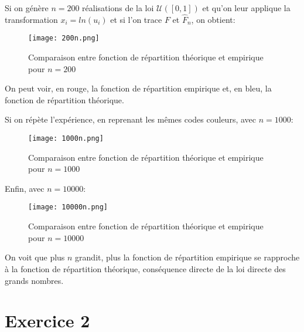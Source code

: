 \documentclass{article}
\begin{document}
\begin{multicols}{2}
Si on génère $n = 200$ réalisations de la loi $\mathcal{U}([0, 1])$ et qu'on
leur applique la transformation $x_i = ln(u_i)$ et si l'on trace $F$ et
$\hat{F}_n$, on obtient:

\begin{figure}[H]
    \begin{center}
        \texttt{[image: 200n.png]}
        \centering
        \captionsetup{justification=centering}
        \caption{\label{fig:200n}Comparaison entre fonction de répartition théorique et empirique pour $n = 200$}
    \end{center}
\end{figure}

On peut voir, en rouge, la fonction de répartition empirique et, en bleu, la
fonction de répartition théorique.

Si on répète l'expérience, en reprenant les mêmes codes couleurs, avec
$n = 1000$:

\begin{figure}[H]
    \begin{center}
        \texttt{[image: 1000n.png]}
        \centering
        \captionsetup{justification=centering}
        \caption{\label{fig:1000n}Comparaison entre fonction de répartition théorique et empirique pour $n = 1000$}
    \end{center}
\end{figure}

Enfin, avec $n = 10000$:

\begin{figure}[H]
    \begin{center}
        \texttt{[image: 10000n.png]}
        \centering
        \captionsetup{justification=centering}
        \caption{\label{fig:10000n}Comparaison entre fonction de répartition théorique et empirique pour $n = 10000$}
    \end{center}
\end{figure}

On voit que plus $n$ grandit, plus la fonction de répartition empirique se
rapproche à la fonction de répartition théorique, conséquence directe de la
loi directe des grands nombres.


\section{Exercice 2}\label{sec:ex2}


\end{multicols}
\end{document}

